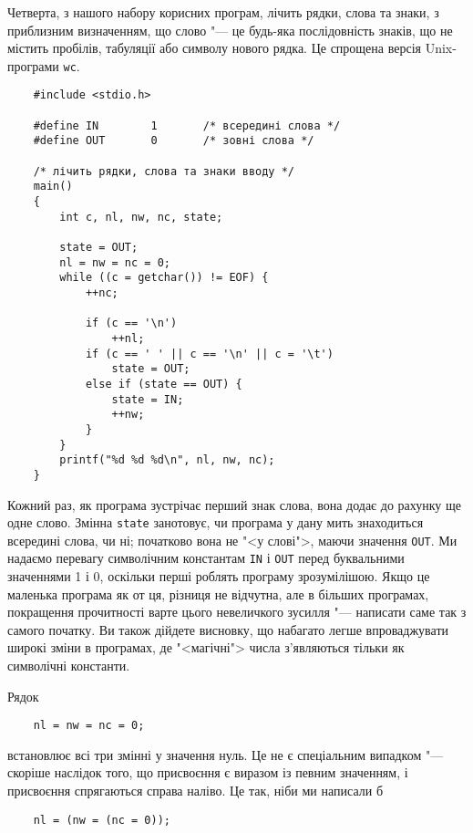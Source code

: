 \documentclass[a4paper,12pt]{book}
\begin{document}
  Четверта, з нашого набору корисних програм, лічить рядки, слова та знаки, з приблизним
  визначенням, що слово "--- це будь-яка послідовність знаків, що не містить пробілів,
  табуляції або символу нового рядка. Це спрощена версія Unix-програми \texttt{wc}.

  \begin{verbatim}
    #include <stdio.h>

    #define IN        1       /* всередині слова */
    #define OUT       0       /* зовні слова */

    /* лічить рядки, слова та знаки вводу */
    main()
    {
        int c, nl, nw, nc, state;

        state = OUT;
        nl = nw = nc = 0;
        while ((c = getchar()) != EOF) {
            ++nc;

            if (c == '\n')
                ++nl;
            if (c == ' ' || c == '\n' || c = '\t')
                state = OUT;
            else if (state == OUT) {
                state = IN;
                ++nw;
            }
        }
        printf("%d %d %d\n", nl, nw, nc);
    }
  \end{verbatim}

  Кожний раз, як програма зустрічає перший знак слова, вона додає до рахунку ще одне
  слово. Змінна \texttt{state} занотовує, чи програма у дану мить знаходиться всередині
  слова, чи ні; початково вона не "<у слові">, маючи значення \texttt{OUT}. Ми
  надаємо перевагу символічним константам \texttt{IN} і \texttt{OUT} перед буквальними
  значеннями 1 і 0, оскільки перші роблять програму зрозумілішою. Якщо це маленька
  програма як от ця, різниця не відчутна, але в більших програмах, покращення прочитності
  варте цього невеличкого зусилля "--- написати саме так з самого початку. Ви також
  дійдете висновку, що набагато легше впроваджувати широкі зміни в програмах, де
  "<магічні"> числа з'являються тільки як символічні константи.

  Рядок
  \begin{verbatim}
    nl = nw = nc = 0;
  \end{verbatim}
  встановлює всі три змінні у значення нуль. Це не є
  спеціальним випадком "--- скоріше наслідок того, що присвоєння є виразом із певним
  значенням, і присвоєння спрягаються справа наліво. Це так, ніби ми написали б
  \begin{verbatim}
    nl = (nw = (nc = 0));
  \end{verbatim}
\end{document}
